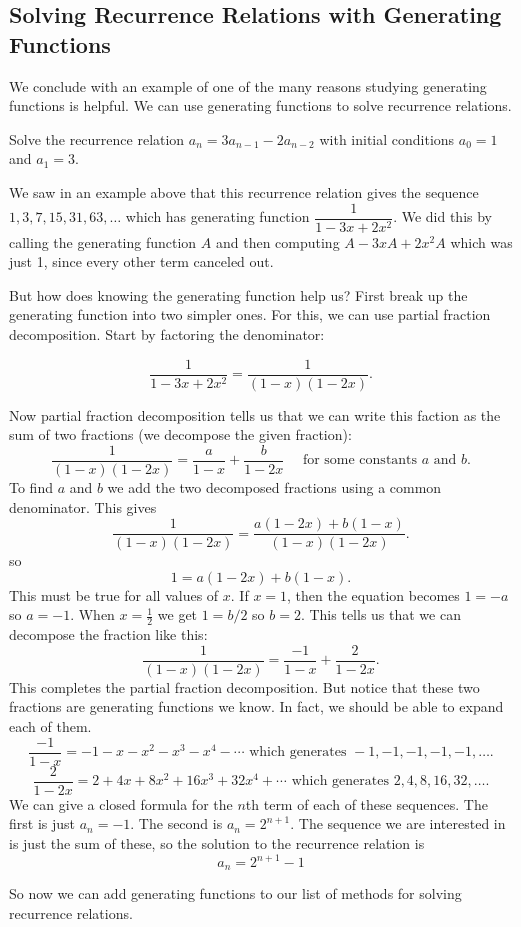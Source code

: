 \documentclass[12pt]{article}
\begin{document}
\subsection{Solving Recurrence Relations with Generating Functions}
We conclude with an example of one of the many reasons studying generating functions is helpful. We can use generating functions to solve recurrence relations.

\begin{example}
 Solve the recurrence relation $a_n = 3a_{n-1} - 2a_{n-2}$ with initial conditions $a_0 = 1$ and $a_1 = 3$.

 \begin{solution}
  We saw in an example above that this recurrence relation gives the sequence $1, 3, 7, 15, 31, 63, \ldots$ which has generating function $\dfrac{1}{1 - 3x + 2x^2}$.  We did this by calling the generating function $A$ and then computing $A - 3xA + 2x^2A$ which was just 1, since every other term canceled out.

  But how does knowing the generating function help us?  First break up the generating function into two simpler ones.  For this, we can use partial fraction decomposition. Start by factoring the denominator:

  \[\frac{1}{1-3x + 2x^2} = \frac{1}{(1-x)(1-2x)}.\]

  Now partial fraction decomposition tells us that we can write this faction as the sum of two fractions (we decompose the given fraction):
  \[\frac{1}{(1-x)(1-2x)} = \frac{a}{1-x} + \frac{b}{1-2x} \mbox{ ~~ for some constants $a$ and $b$}.\]
  To find $a$ and $b$ we add the two decomposed fractions using a common denominator.  This gives
  \[\frac{1}{(1-x)(1-2x)} = \frac{a(1-2x) + b(1-x)}{(1-x)(1-2x)}.\]
  so
  \[1 = a(1-2x) + b(1-x).\]
  This must be true for all values of $x$.  If $x = 1$, then the equation becomes $1 = -a$ so $a = -1$.  When $x = \frac{1}{2}$ we get $1 = b/2$ so $b = 2$.  This tells us that we can decompose the fraction like this:
  \[\frac{1}{(1-x)(1-2x)} = \frac{-1}{1-x} + \frac{2}{1-2x}.\]
  This completes the partial fraction decomposition.  But notice that these two fractions are generating functions we know.  In fact, we should be able to expand each of them.
  \[\frac{-1}{1-x} = -1 - x - x^2 -x^3 - x^4 - \cdots \mbox{ which generates } -1, -1, -1, -1, -1, \ldots.\]
  \[\frac{2}{1-2x} = 2 + 4x + 8x^2 + 16x^3 + 32x^4 + \cdots \mbox{ which generates } 2, 4, 8, 16, 32, \ldots.\]
  We can give a closed formula for the $n$th term of each of these sequences.  The first is just $a_n = -1$.  The second is $a_n = 2^{n+1}$.  The sequence we are interested in is just the sum of these, so the solution to the recurrence relation is
  \[a_n = 2^{n+1} - 1\]
 \end{solution}

\end{example}

So now we can add generating functions to our list of methods for solving recurrence relations.
\end{document}
